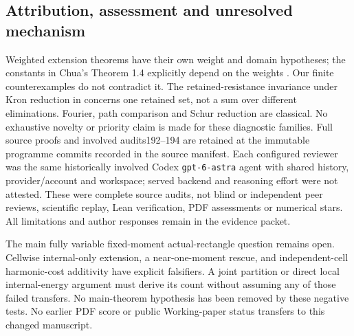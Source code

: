 \subsection{Attribution, assessment and unresolved mechanism}
Weighted extension theorems have their own weight and domain hypotheses;
the constants in Chua's Theorem 1.4 explicitly depend on the weights
\cite{bd:chua}. Our finite counterexamples do not contradict it.
The retained-resistance invariance under Kron reduction in
\cite{bd:kron} concerns one retained set, not a sum over different
eliminations. Fourier, path comparison and Schur reduction are classical.
No exhaustive novelty or priority claim is made for these diagnostic
families. Full source proofs and involved audits192--194 are retained at
the immutable programme commits recorded in the source manifest. Each
configured reviewer was the same historically involved Codex
\texttt{gpt-6-astra} agent with shared history, provider/account and
workspace; served backend and reasoning effort were not attested. These
were complete source audits, not blind or independent peer reviews,
scientific replay, Lean verification, PDF assessments or numerical stars.
All limitations and author responses remain in the evidence packet.

The main fully variable fixed-moment actual-rectangle question remains
open. Cellwise internal-only extension, a near-one-moment rescue, and
independent-cell harmonic-cost additivity have explicit falsifiers.
A joint partition or direct local internal-energy argument must derive
its count without assuming any of those failed transfers. No main-theorem
hypothesis has been removed by these negative tests. No earlier PDF score
or public Working-paper status transfers to this changed manuscript.
